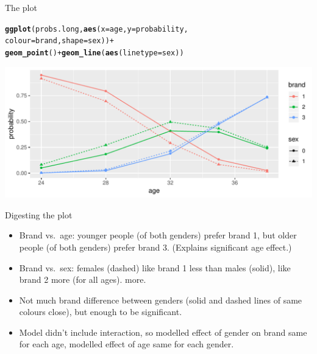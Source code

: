 \documentclass[unknownkeysallowed]{beamer}\usepackage[]{graphicx}\usepackage[]{color}
\makeatletter
\def\maxwidth{ %
  \ifdim\Gin@nat@width>\linewidth
    \linewidth
  \else
    \Gin@nat@width
  \fi
}
\newcommand{\hlopt}[1]{\textcolor[rgb]{0,0,0}{#1}}%
\newcommand{\hlstd}[1]{\textcolor[rgb]{0.345,0.345,0.345}{#1}}%
\newcommand{\hlkwc}[1]{\textcolor[rgb]{0.333,0.667,0.333}{#1}}%
\newcommand{\hlkwd}[1]{\textcolor[rgb]{0.737,0.353,0.396}{\textbf{#1}}}%
\newenvironment{kframe}{%
 \def\at@end@of@kframe{}%
 \ifinner\ifhmode%
  \def\at@end@of@kframe{\end{minipage}}%
  \begin{minipage}{\columnwidth}%
 \fi\fi%
 \def\FrameCommand##1{\hskip\@totalleftmargin \hskip-\fboxsep
 \colorbox{shadecolor}{##1}\hskip-\fboxsep
     \hskip-\linewidth \hskip-\@totalleftmargin \hskip\columnwidth}%
 \MakeFramed {\advance\hsize-\width
   \@totalleftmargin\z@ \linewidth\hsize
   \@setminipage}}%
 {\par\unskip\endMakeFramed%
 \at@end@of@kframe}
\newenvironment{knitrout}{}{} %
\makeatother
\begin{document}
\begin{frame}[fragile]{The plot}
  
\begin{knitrout}
\color{fgcolor}\begin{kframe}
\begin{alltt}
\hlkwd{ggplot}\hlstd{(probs.long,}\hlkwd{aes}\hlstd{(}\hlkwc{x}\hlstd{=age,}\hlkwc{y}\hlstd{=probability,}
  \hlkwc{colour}\hlstd{=brand,}\hlkwc{shape}\hlstd{=sex))}\hlopt{+}
  \hlkwd{geom_point}\hlstd{()}\hlopt{+}\hlkwd{geom_line}\hlstd{(}\hlkwd{aes}\hlstd{(}\hlkwc{linetype}\hlstd{=sex))}
\end{alltt}
\end{kframe}
\includegraphics[width=\maxwidth]{figure/unnamed-chunk-109-1} 

\end{knitrout}
\end{frame}


\begin{frame}[fragile]{Digesting the plot}
  
  \begin{itemize}
  \item Brand vs.\ age: younger people (of both genders) prefer brand
    1, but older people (of both genders) prefer brand 3. (Explains
    significant age effect.)
  \item Brand vs.\ sex: females (dashed) like brand 1 less than males
    (solid), like brand 2 more (for all ages). 
    more.
  \item Not much brand difference between genders (solid and dashed
    lines of same colours close), but enough to be significant.
  \item Model didn't include interaction, so modelled effect of gender
    on brand same for each age, modelled effect of age same for each
    gender. 
  \end{itemize}
  
\end{frame}
\end{document}
